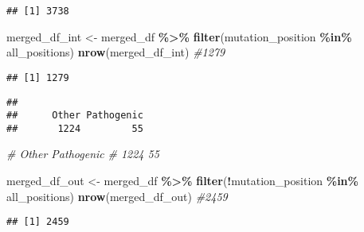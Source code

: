 \documentclass[
]{article}
\newenvironment{Shaded}{\begin{snugshade}}{\end{snugshade}}
\newcommand{\CommentTok}[1]{\textcolor[rgb]{0.56,0.35,0.01}{\textit{#1}}}
\newcommand{\FunctionTok}[1]{\textcolor[rgb]{0.13,0.29,0.53}{\textbf{#1}}}
\newcommand{\NormalTok}[1]{#1}
\newcommand{\OtherTok}[1]{\textcolor[rgb]{0.56,0.35,0.01}{#1}}
\newcommand{\SpecialCharTok}[1]{\textcolor[rgb]{0.81,0.36,0.00}{\textbf{#1}}}
\begin{document}
\begin{verbatim}
## [1] 3738
\end{verbatim}

\begin{Shaded}
\begin{Highlighting}[]
\NormalTok{merged\_df\_int }\OtherTok{\textless{}{-}}\NormalTok{ merged\_df }\SpecialCharTok{\%\textgreater{}\%} \FunctionTok{filter}\NormalTok{(mutation\_position }\SpecialCharTok{\%in\%}\NormalTok{ all\_positions)}
\FunctionTok{nrow}\NormalTok{(merged\_df\_int) }\CommentTok{\#1279}
\end{Highlighting}
\end{Shaded}

\begin{verbatim}
## [1] 1279
\end{verbatim}

\begin{Shaded}
\end{Shaded}

\begin{verbatim}
## 
##      Other Pathogenic 
##       1224         55
\end{verbatim}

\begin{Shaded}
\begin{Highlighting}[]
 \CommentTok{\# Other Pathogenic }
 \CommentTok{\#      1224         55 }

\NormalTok{merged\_df\_out }\OtherTok{\textless{}{-}}\NormalTok{ merged\_df }\SpecialCharTok{\%\textgreater{}\%} \FunctionTok{filter}\NormalTok{(}\SpecialCharTok{!}\NormalTok{mutation\_position }\SpecialCharTok{\%in\%}\NormalTok{ all\_positions)}
\FunctionTok{nrow}\NormalTok{(merged\_df\_out) }\CommentTok{\#2459}
\end{Highlighting}
\end{Shaded}

\begin{verbatim}
## [1] 2459
\end{verbatim}

\begin{Shaded}
\end{Shaded}
\end{document}
